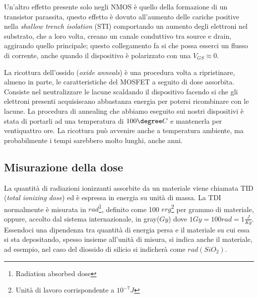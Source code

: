 Un'altro effetto presente solo negli NMOS è quello della formazione di un transistor parassita\cite{effetti_radiazioni:CMOS_IC_radiation_hardening_by_design}, questo effetto è dovuto all'aumento delle cariche positive nella \textit{shallow trench isolation} (STI) comportando un aumento degli elettroni nel substrato, che a loro volta, creano un canale conduttivo tra source e drain, aggirando quello principale; questo collegamento fa si che possa esserci un flusso di corrente, anche quando il dispositivo è polarizzato con una $V_{GS} \approx 0$.

\vspace{0.5cm}

La ricottura dell'ossido (\textit{oxide anneals}) è una procedura volta a ripristinare, almeno in parte, le caratteristiche del MOSFET a seguito di dose assorbita.
Consiste nel neutralizzare le lacune scaldando il dispositivo facendo si che gli elettroni presenti acquisiscano abbastanza energia per potersi ricombinare con le lacune. La procedura di annealing che abbiamo eseguito sui nostri dispositivi è stata di portarli ad una temperatura di $100\degree C$ e mantenerla per ventiquattro ore. La ricottura può avvenire anche a temperatura ambiente, ma probabilmente i tempi sarebbero molto lunghi, anche anni\cite{bib:Effetti_Radiazioni_NASA}. 

\subsection{Misurazione della dose}
La quantità di radiazioni ionizzanti assorbite da un materiale viene chiamata TID (\textit{total ionizing dose}) ed è espressa in energia su unità di massa.
La TDI normalmente è misurata in $rad$\footnote{Radiation absorbed dose}, definito come 100 $erg$\footnote{Unità di lavoro corrispondente a $10^{-7} J$} per grammo di materiale, oppure, accolto dal sistema internazionale, in gray($Gy$) dove $1 Gy = 100rad = 1\frac{J}{Kg}$.
Essendoci una dipendenza tra quantità di energia persa e il materiale su cui essa si sta depositando, spesso insieme all'unità di misura, si indica anche il materiale, ad esempio, nel caso del diossido di silicio si indicherà come $rad(SiO_{2})$. 




